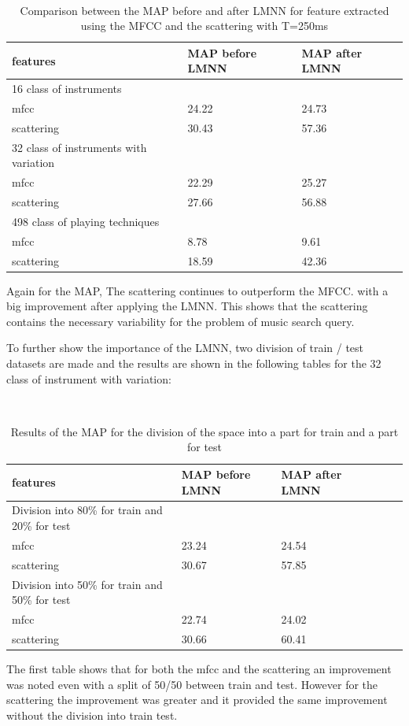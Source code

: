 \documentclass[hidelinks,12pt]{report}
\begin{document}
  \begin{table} [H]
\begin{center} 
\ 
 \setlength{\tabcolsep}{.16667em} 
\begin{tabular}{|l|l|l|} 
\hline
features & MAP before LMNN & MAP after LMNN  \\ 
\hline 
16 class of instruments \\ 
\hline
mfcc         &     24.22& 24.73   \\ 
scattering   &30.43  & 57.36 \\ 

\hline 
32 class of instruments with variation \\ 
\hline
mfcc &22.29 & 25.27  \\ 
scattering &27.66& 56.88  \\ 
\hline 
498 class of playing techniques \\ 
\hline
mfcc &  8.78 & 9.61  \\ 
scattering &18.59& 42.36  \\ 
\hline
\end{tabular} 
\end{center} 
\caption{Comparison between the MAP before and after LMNN for feature extracted using the MFCC and the scattering with T=250ms} 
\label{you} 
\end{table}
Again for the MAP, The scattering continues to outperform the MFCC. with a big improvement after applying the LMNN. This shows that the scattering contains the necessary variability for the problem of music search query.\par
To further show the importance of the LMNN, two division of train / test datasets are made  and the results are shown in the following tables for the 32 class of instrument with variation:
\begin{table} [H]
\begin{center} 
\ 
 \setlength{\tabcolsep}{.16667em} 
\begin{tabular}{ | l | l | l | l | l |l|}
\hline
features & MAP before LMNN & MAP after LMNN  \\ 
\hline 
Division into 80\% for train and 20\% for test \\
\hline
mfcc & 23.24& 24.54  \\ 
scattering &30.67& 57.85    \\ 
\hline
Division into 50\% for train and 50\% for test \\
\hline
mfcc & 22.74& 24.02  \\ 
scattering & 30.66 & 60.41  \\ 
\hline
\end{tabular} 
\end{center} 
\caption{Results of the MAP for the division of the space into a part for train and a part for test} 
\label{you} 
\end{table} 
The first table shows that for both the mfcc and the scattering an improvement was noted even with a split of 50/50 between train and test. However for the scattering  the improvement was greater and it provided the same improvement without the division into train test.
\end{document}
